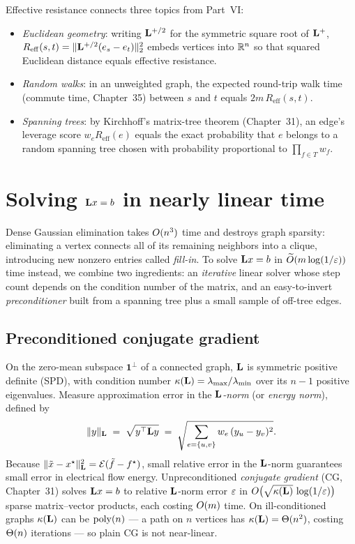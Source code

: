 \begin{connectionbox}
Effective resistance connects three topics from Part~VI:
\begin{itemize}
  \item \emph{Euclidean geometry}: writing $\mathbf{L}^{+/2}$ for the symmetric square root of $\mathbf{L}^{+}$, $R_{\mathrm{eff}}(s,t) = \lVert\mathbf{L}^{+/2}(e_s - e_t)\rVert_2^2$ embeds vertices into $\mathbb{R}^n$ so that squared Euclidean distance equals effective resistance.
  \item \emph{Random walks}: in an unweighted graph, the expected round-trip walk time (commute time, Chapter~35) between $s$ and $t$ equals $2m\,R_{\mathrm{eff}}(s,t)$.
  \item \emph{Spanning trees}: by Kirchhoff's matrix-tree theorem (Chapter~31), an edge's leverage score $w_e R_{\mathrm{eff}}(e)$ equals the exact probability that $e$ belongs to a random spanning tree chosen with probability proportional to $\prod_{f \in T} w_f$.
\end{itemize}
\end{connectionbox}

\section{Solving \texorpdfstring{$\mathbf{L} x = b$}{Lx=b} in nearly linear time}\label{ch41:solve}

Dense Gaussian elimination takes $O(n^3)$ time and destroys graph sparsity: eliminating a vertex connects all of its remaining neighbors into a clique, introducing new nonzero entries called \emph{fill-in}. To solve $\mathbf{L} x = b$ in $\widetilde{O}(m \log(1/\varepsilon))$ time instead, we combine two ingredients: an \emph{iterative} linear solver whose step count depends on the condition number of the matrix, and an easy-to-invert \emph{preconditioner} built from a spanning tree plus a small sample of off-tree edges.

\subsection{Preconditioned conjugate gradient}\label{ch41:pcg}

On the zero-mean subspace $\mathbf{1}^\perp$ of a connected graph, $\mathbf{L}$ is symmetric positive definite (SPD), with condition number $\kappa(\mathbf{L})=\lambda_{\max}/\lambda_{\min}$ over its $n-1$ positive eigenvalues. Measure approximation error in the \emph{$\mathbf{L}$-norm} (or \emph{energy norm}), defined by
\[
  \lVert y\rVert_{\mathbf{L}} \;=\; \sqrt{y^\top \mathbf{L} y} \;=\; \sqrt{\sum_{e=\{u,v\}} w_e\,(y_u - y_v)^2} .
\]
Because $\lVert\tilde{x} - x^\star\rVert_{\mathbf{L}}^2 = \mathcal{E}(\tilde{f} - f^\star)$, small relative error in the $\mathbf{L}$-norm guarantees small error in electrical flow energy. Unpreconditioned \emph{conjugate gradient} (CG, Chapter~31) solves $\mathbf{L} x=b$ to relative $\mathbf{L}$-norm error $\varepsilon$ in $O\bigl(\sqrt{\kappa(\mathbf{L})}\,\log(1/\varepsilon)\bigr)$ sparse matrix--vector products, each costing $O(m)$ time. On ill-conditioned graphs $\kappa(\mathbf{L})$ can be $\operatorname{poly}(n)$ --- a path on $n$ vertices has $\kappa(\mathbf{L})=\Theta(n^2)$, costing $\Theta(n)$ iterations --- so plain CG is not near-linear.

